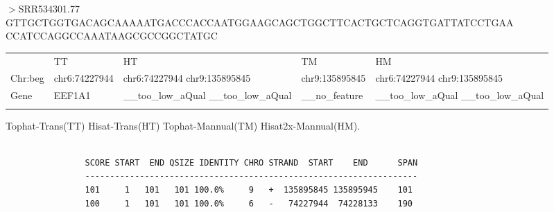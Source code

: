 \begin{frame}[c,fragile]
	\begin{examples}
		$>$SRR534301.77\\
		\tiny{GTTGCTGGTGACAGCAAAAATGACCCACCAATGGAAGCAGCTGGCTTCACTGCTCAGGTGATTATCCTGAA\\CCATCCAGGCCAAATAAGCGCCGGCTATGC}
		\tiny{
			\begin{table}
			\centering
			\begin{tabular}{  C{1cm}  C{1.2cm}  C{1.2cm}  C{1.2cm}  C{1.2cm}  }
			\hline\noalign{\smallskip}
						& TT 	& HT  &	TM	 & HM  	\\
			\noalign{\smallskip}\hline\noalign{\smallskip}
			Chr:beg	&	chr6:74227944		& chr6:74227944 chr9:135895845    &	chr9:135895845 & chr6:74227944 chr9:135895845	\\
			Gene		&	EEF1A1            & \_\_too\_low\_aQual \_\_too\_low\_aQual &	\_\_no\_feature   & \_\_too\_low\_aQual \_\_too\_low\_aQual	\\
			\noalign{\smallskip}\hline
			\end{tabular}
			\end{table}
		}
		
		\scriptsize{Tophat-Trans(TT) Hisat-Trans(HT) Tophat-Mannual(TM) Hisat2x-Mannual(HM).}
		\begin{lstlisting}[basicstyle=\tiny]
			
				SCORE START  END QSIZE IDENTITY CHRO STRAND  START    END      SPAN
				-------------------------------------------------------------------
				101     1   101   101 100.0%     9   +  135895845 135895945    101
				100     1   101   101 100.0%     6   -   74227944  74228133    190

		\end{lstlisting}
		\end{examples}
	
\end{frame}

